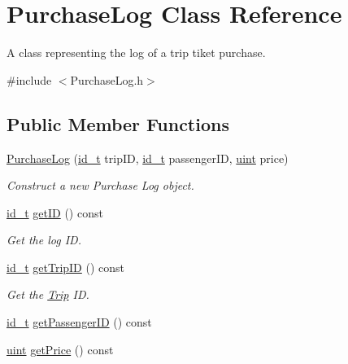 \hypertarget{classPurchaseLog}{}\section{Purchase\+Log Class Reference}
\label{classPurchaseLog}


A class representing the log of a trip tiket purchase.  




{\ttfamily \#include $<$Purchase\+Log.\+h$>$}

\subsection*{Public Member Functions}
\begin{DoxyCompactItemize}
\item 
\mbox{\hyperlink{classPurchaseLog_a0a08beb4b5c7c2e404747228235f9b07}{Purchase\+Log}} (\mbox{\hyperlink{project__utils_8h_a8f3a969054ad2200720b96e7e23dd4e1}{id\+\_\+t}} trip\+ID, \mbox{\hyperlink{project__utils_8h_a8f3a969054ad2200720b96e7e23dd4e1}{id\+\_\+t}} passenger\+ID, \mbox{\hyperlink{project__utils_8h_a91ad9478d81a7aaf2593e8d9c3d06a14}{uint}} price)
\begin{DoxyCompactList}\small\item\em Construct a new Purchase Log object. \end{DoxyCompactList}\item 
\mbox{\hyperlink{project__utils_8h_a8f3a969054ad2200720b96e7e23dd4e1}{id\+\_\+t}} \mbox{\hyperlink{classPurchaseLog_abf4047c704b4f0525f3bd75cf977064d}{get\+ID}} () const
\begin{DoxyCompactList}\small\item\em Get the log ID. \end{DoxyCompactList}\item 
\mbox{\hyperlink{project__utils_8h_a8f3a969054ad2200720b96e7e23dd4e1}{id\+\_\+t}} \mbox{\hyperlink{classPurchaseLog_ae420531b2c843e42a703a380badb7c91}{get\+Trip\+ID}} () const
\begin{DoxyCompactList}\small\item\em Get the \mbox{\hyperlink{classTrip}{Trip}} ID. \end{DoxyCompactList}\item 
\mbox{\hyperlink{project__utils_8h_a8f3a969054ad2200720b96e7e23dd4e1}{id\+\_\+t}} \mbox{\hyperlink{classPurchaseLog_a46f469bc497e4b42dc8276e5608f7ade}{get\+Passenger\+ID}} () const
\item 
\mbox{\hyperlink{project__utils_8h_a91ad9478d81a7aaf2593e8d9c3d06a14}{uint}} \mbox{\hyperlink{classPurchaseLog_aca334b2dea62a89d28daea66972f7972}{get\+Price}} () const
\end{DoxyCompactItemize}
